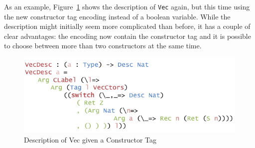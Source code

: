 \documentclass{ituthesis}
\begin{document}
As an example, Figure~\ref{fig:vecdescim} shows the description of \texttt{Vec} again, but this time using the new constructor tag encoding instead of a boolean variable.
While the description might initially seem more complicated than before, it has a couple of clear advantages: the encoding now contain the constructor tag and it is possible to choose between more than two constructors at the same time.

\begin{figure}[H]
\begin{center}
    \includegraphics[scale=0.5]{Figures/VectorDescriptionImproved.png}
\end{center}
\caption{Description of Vec given a Constructor Tag}
\label{fig:vecdescim}
\end{figure}





\end{document}
